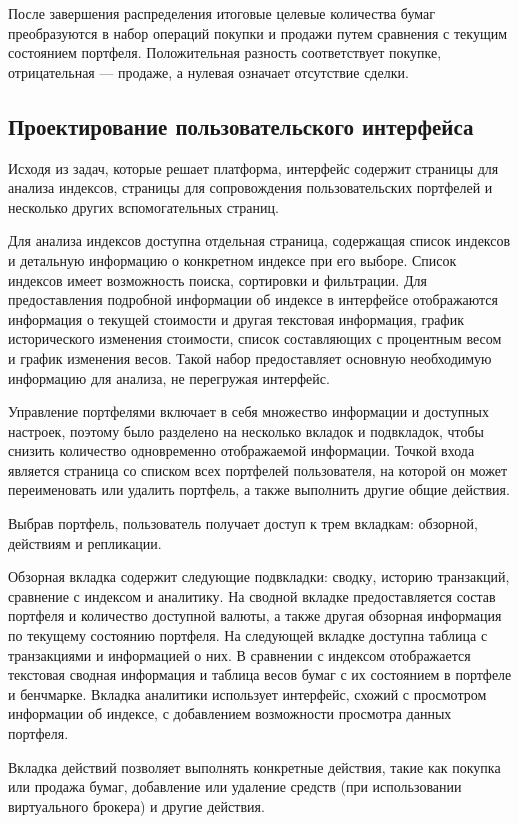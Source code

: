 \documentclass[14pt]{gost-7-32}
\begin{document}
После завершения распределения итоговые целевые количества бумаг преобразуются в набор операций покупки и продажи путем сравнения с текущим состоянием портфеля. Положительная разность соответствует покупке, отрицательная --- продаже, а нулевая означает отсутствие сделки.

\subsection{Проектирование пользовательского интерфейса}

Исходя из задач, которые решает платформа, интерфейс содержит страницы для анализа индексов, страницы для сопровождения пользовательских портфелей и несколько других вспомогательных страниц.

Для анализа индексов доступна отдельная страница, содержащая список индексов и детальную информацию о конкретном индексе при его выборе. Список индексов имеет возможность поиска, сортировки и фильтрации. Для предоставления подробной информации об индексе в интерфейсе отображаются информация о текущей стоимости и другая текстовая информация, график исторического изменения стоимости, список составляющих с процентным весом и график изменения весов. Такой набор предоставляет основную необходимую информацию для анализа, не перегружая интерфейс.

Управление портфелями включает в себя множество информации и доступных настроек, поэтому было разделено на несколько вкладок и подвкладок, чтобы снизить количество одновременно отображаемой информации. Точкой входа является страница со списком всех портфелей пользователя, на которой он может переименовать или удалить портфель, а также выполнить другие общие действия.

Выбрав портфель, пользователь получает доступ к трем вкладкам: обзорной, действиям и репликации.

Обзорная вкладка содержит следующие подвкладки: сводку, историю транзакций, сравнение с индексом и аналитику.
На сводной вкладке предоставляется состав портфеля и количество доступной валюты, а также другая обзорная информация по текущему состоянию портфеля. На следующей вкладке доступна таблица с транзакциями и информацией о них. В сравнении с индексом отображается текстовая сводная информация и таблица весов бумаг с их состоянием в портфеле и бенчмарке. Вкладка аналитики использует интерфейс, схожий с просмотром информации об индексе, с добавлением возможности просмотра данных портфеля.

Вкладка действий позволяет выполнять конкретные действия, такие как покупка или продажа бумаг, добавление или удаление средств (при использовании виртуального брокера) и другие действия.
\end{document}
